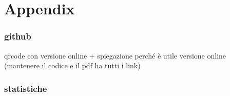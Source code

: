 \documentclass[11pt, twoside, openright]{book}
\begin{document}
\frontmatter
%



\tableofcontents
\clearpage
\listofvideos
\listofsounds
\listofeffets
\listoffotos




\mainmatter










 


\backmatter
\chapter*{Appendix}
\subsection*{github}
qrcode con versione online + spiegazione perché è utile versione online (mantenere il codice e il pdf ha tutti i link)

\subsection*{statistiche}
\end{document}
